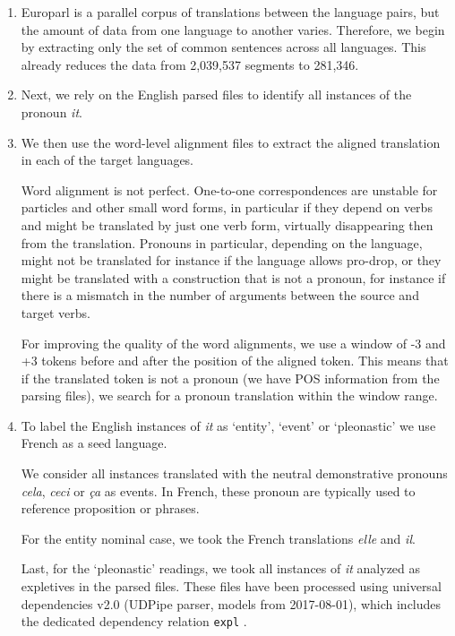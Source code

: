 \documentclass[10pt, a4paper]{article}
\begin{document}
\begin{enumerate}\setlength\itemsep{1em}

\item Europarl is a parallel corpus of translations
between the language pairs, but the amount of data from one language to another
varies. Therefore, we begin by extracting only the set of common sentences
across all languages. This already reduces the data from 2,039,537 segments to
281,346. 

\item  Next, we rely on the English parsed files to
identify all instances of the pronoun \textit{it}.

\item We then use the word-level alignment files to
extract the aligned translation in each of the target languages.

Word alignment is not perfect. One-to-one correspondences are unstable for
particles and other small word forms, in particular if they depend on verbs and 
might be translated by just one verb form, virtually disappearing then from the
translation. Pronouns in particular, depending on the language, might not be
translated for instance if the language allows pro-drop, or they might be
translated with a construction that is not a pronoun, for instance if there is a 
mismatch in the number of arguments between the source and target verbs.


For improving the quality of the word alignments, we use a window of -3 and
+3 tokens before and after the position of the aligned token. This means that if
the translated token is not a pronoun (we have POS information from the parsing
files), we search for a pronoun translation within the window range.

\item To label the English instances of \textit{it} as `entity', `event' or 
`pleonastic' we use French as a seed language.

We consider all instances 
translated with the neutral demonstrative pronouns \textit{cela}, \textit{ceci} or 
\textit{ça} as events. In French, these pronoun are typically used to reference 
proposition or phrases. 

For the entity nominal case, we took the French translations \textit{elle} and 
\textit{il}.

Last, for the `pleonastic' readings, we took all instances of \textit{it} analyzed 
as expletives in the parsed files. These files have been processed using universal 
dependencies v2.0 (UDPipe parser, models from 2017-08-01), which includes the 
dedicated dependency relation \texttt{expl} \cite{bouma-etal-2018-expletives}.


\end{enumerate}
\end{document}
